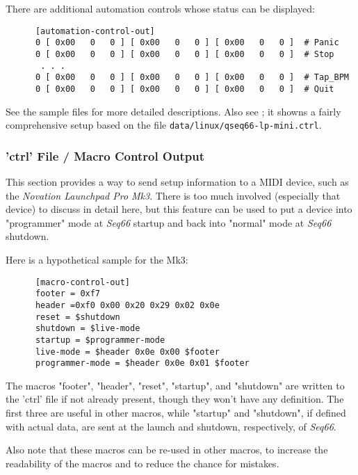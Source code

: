    There are additional automation controls whose status can be displayed:

   \begin{verbatim}
      [automation-control-out]
      0 [ 0x00   0   0 ] [ 0x00   0   0 ] [ 0x00   0   0 ]  # Panic
      0 [ 0x00   0   0 ] [ 0x00   0   0 ] [ 0x00   0   0 ]  # Stop
       . . .
      0 [ 0x00   0   0 ] [ 0x00   0   0 ] [ 0x00   0   0 ]  # Tap_BPM
      0 [ 0x00   0   0 ] [ 0x00   0   0 ] [ 0x00   0   0 ]  # Quit
   \end{verbatim}

   See the sample files for more detailed descriptions.
   Also see ; it showns a fairly comprehensive
   setup based on the file \texttt{data/linux/qseq66-lp-mini.ctrl}.

\subsubsection{'ctrl' File / Macro Control Output}
\label{subsubsec:configuration_ctrl_macro_control_out}

   This section provides a way to send setup information to a MIDI device,
   such as the \textsl{Novation Launchpad Pro Mk3}.
   There is too much involved (especially that device) to discuss in
   detail here, but this feature can be used to put a device into
   "programmer" mode at \textsl{Seq66} startup and back into
   "normal" mode at \textsl{Seq66} shutdown.

   Here is a hypothetical sample for the Mk3:

   \begin{verbatim}
      [macro-control-out]
      footer = 0xf7
      header =0xf0 0x00 0x20 0x29 0x02 0x0e 
      reset = $shutdown
      shutdown = $live-mode
      startup = $programmer-mode
      live-mode = $header 0x0e 0x00 $footer
      programmer-mode = $header 0x0e 0x01 $footer
   \end{verbatim}

   The macros "footer", "header", "reset", "startup", and "shutdown"
   are written to the 'ctrl' file if not already present, though
   they won't have any definition.
   The first three are useful in other macros, while "startup" and
   "shutdown", if defined with actual data, are sent at the launch
   and shutdown, respectively, of \textsl{Seq66}.

   Also note that these macros can be re-used in other macros, to
   increase the readability of the macros and to reduce the
   chance for mistakes.

